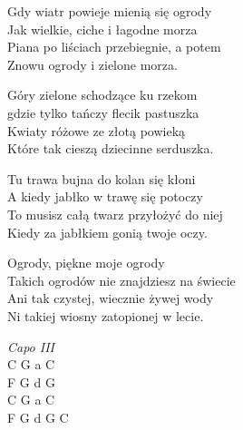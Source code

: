 \begin{text}
    \ifchorded{\hfill\break}
    Gdy wiatr powieje mienią się ogrody\\
    Jak wielkie, ciche i łagodne morza\\
    Piana po liściach przebiegnie, a potem\\
    Znowu ogrody i zielone morza.

    Góry zielone schodzące ku rzekom\\
    gdzie tylko tańczy flecik pastuszka\\
    Kwiaty różowe ze złotą powieką\\
    Które tak cieszą dziecinne serduszka.

    Tu trawa bujna do kolan się kłoni\\
    A kiedy jabłko w trawę się potoczy\\
    To musisz całą twarz przyłożyć do niej\\
    Kiedy za jabłkiem gonią twoje oczy.

    Ogrody, piękne moje ogrody\\
    Takich ogrodów nie znajdziesz na świecie\\
    Ani tak czystej, wiecznie żywej wody\\
    Ni takiej wiosny zatopionej w lecie.
\end{text}
\begin{chord}
    \textit{Capo III}\\
    C G	a C\\
    F G	d G\\
    C G	a C\\
    F G	d G	C
\end{chord}